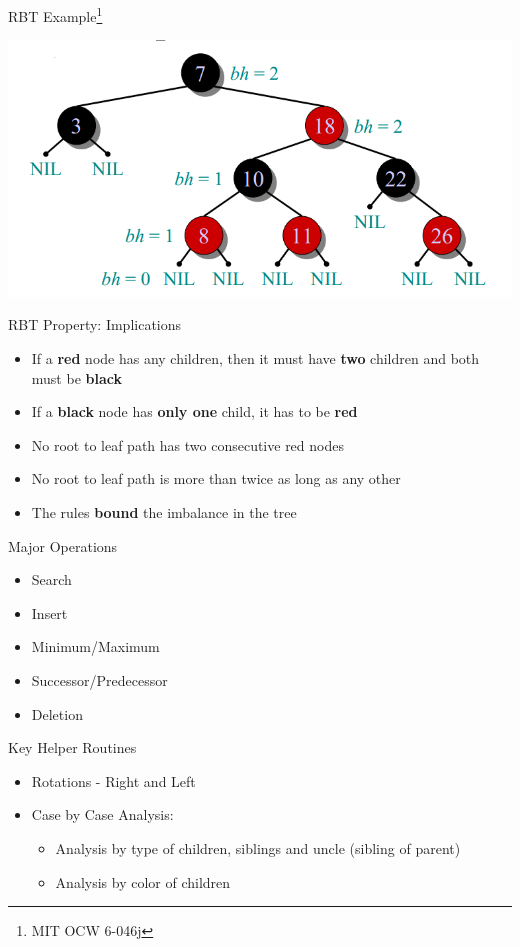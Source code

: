 \documentclass{beamer}
\begin{document}
\begin{frame}{RBT Example\footnote{MIT OCW 6-046j}}
    \begin{center}
        \includegraphics[scale=0.4]{rbtEg2.png}
    \end{center}
\end{frame}

\begin{frame}{RBT Property: Implications}
    \begin{itemize}
        \item If a {\bf red} node has any children, then it must have {\bf two} children and both must be {\bf black}
        \item If a {\bf black} node has {\bf only one} child, it has to be {\bf red}
        \item No root to leaf path has two consecutive red nodes
        \item No root to leaf path is more than twice as long as any other
        \item The rules {\bf bound} the imbalance in the tree
    \end{itemize}
\end{frame}


\begin{frame}{Major Operations}
    \begin{itemize}
        \item Search
        \item Insert
        \item Minimum/Maximum
        \item Successor/Predecessor
        \item Deletion
    \end{itemize}
\end{frame}

\begin{frame}{Key Helper Routines}
    \begin{itemize}
        \item Rotations - Right and Left
        \item Case by Case Analysis:
        \begin{itemize}
            \item Analysis by type of children, siblings and uncle (sibling of parent)
            \item Analysis by color of children
        \end{itemize}
    \end{itemize}
\end{frame}
\end{document}
